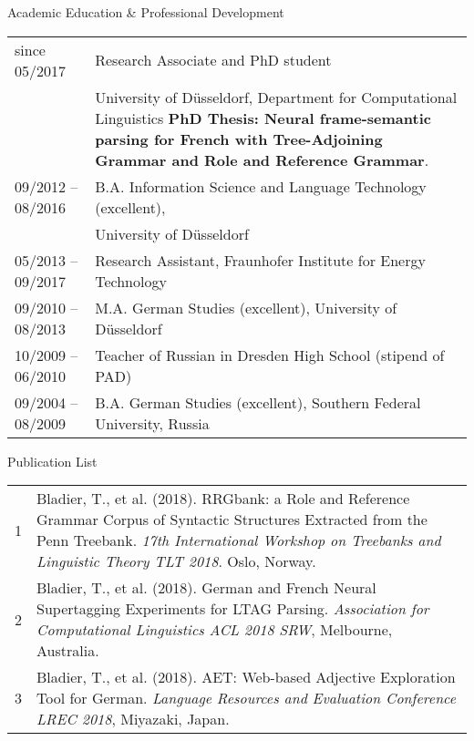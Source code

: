 \documentclass{resume} %
\begin{document}
\begin{rSection}{Academic Education \& Professional Development}

\hspace{-20pt}
\begin{tabular}{p{3.8cm}p{13cm}}
 since 05/2017  &  Research Associate and PhD student \\
& University of D{\"u}sseldorf, Department for Computational Linguistics \newline \vspace{-10pt}  \newline   \textbf{PhD Thesis: Neural frame-semantic parsing for French with Tree-Adjoining Grammar and Role and Reference Grammar}. \\[5pt]
09/2012 -- 08/2016  & B.A. Information Science and Language Technology (excellent), \\
& University of D{\"u}sseldorf  \\[5pt]
05/2013 -- 09/2017  &  Research Assistant, Fraunhofer Institute for Energy Technology \\[5pt]
 09/2010 -- 08/2013  &  M.A. German Studies (excellent), University of D{\"u}sseldorf  \\[5pt]
 10/2009 -- 06/2010 &  Teacher of Russian in Dresden High School (stipend of PAD)  \\[5pt]
 09/2004 -- 08/2009 &  B.A. German Studies (excellent), Southern Federal University, Russia 
\end{tabular}

\end{rSection}


\bigskip

\begin{rSection}{Publication List}

\hspace{-20pt}
\begin{tabular}{p{0.1cm}p{17cm}}
 1 & Bladier, T., et al. (2018). RRGbank: a Role and Reference Grammar Corpus of Syntactic Structures Extracted from the Penn Treebank.  {\it 17th International Workshop on Treebanks and Linguistic Theory TLT 2018}. Oslo, Norway. \\[5pt]
 2 & Bladier, T., et al. (2018). German and French Neural Supertagging Experiments for LTAG Parsing. {\it Association for Computational Linguistics ACL 2018 SRW}, Melbourne, Australia. \\[5pt]
 3 & Bladier, T., et al. (2018). AET: Web-based Adjective Exploration Tool for German. {\it  Language Resources and Evaluation Conference LREC 2018}, Miyazaki, Japan. 
\end{tabular}

\end{rSection}
\end{document}
